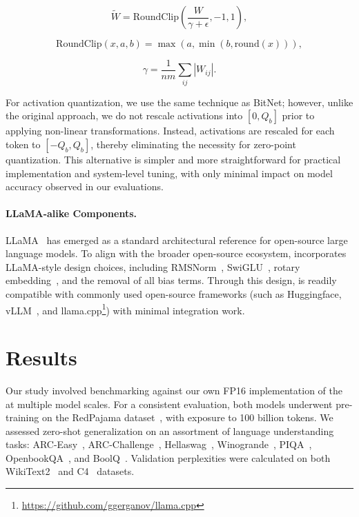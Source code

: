 \begin{equation}
    \widetilde{W} = \mathrm{RoundClip}(\frac{W}{\gamma + \epsilon}, -1, 1),
\end{equation}

\begin{equation}
    \mathrm{RoundClip}(x, a, b) = \max(a, \min(b, \mathrm{round}(x))),
\end{equation}

\begin{equation}
    \gamma = \frac{1}{nm}\sum_{ij} |W_{ij}|.
\end{equation}

For activation quantization, we use the same technique as BitNet; however, unlike the original approach, we do not rescale activations into $[0, Q_b]$ prior to applying non-linear transformations. Instead, activations are rescaled for each token to $[-Q_b, Q_b]$, thereby eliminating the necessity for zero-point quantization. This alternative is simpler and more straightforward for practical implementation and system-level tuning, with only minimal impact on model accuracy observed in our evaluations.

\paragraph{LLaMA-alike Components.}

LLaMA~\cite{llama, llama2} has emerged as a standard architectural reference for open-source large language models. To align with the broader open-source ecosystem,  incorporates LLaMA-style design choices, including RMSNorm~\cite{rmsnorm}, SwiGLU~\cite{swiglu}, rotary embedding~\cite{rope}, and the removal of all bias terms. Through this design,  is readily compatible with commonly used open-source frameworks (such as Huggingface, vLLM~\cite{vllm}, and llama.cpp\footnote{\url{https://github.com/ggerganov/llama.cpp}}) with minimal integration work.

\section{Results}

Our study involved benchmarking  against our own FP16 implementation of the  at multiple model scales. For a consistent evaluation, both models underwent pre-training on the RedPajama dataset~\cite{redpajama}, with exposure to 100 billion tokens. We assessed zero-shot generalization on an assortment of language understanding tasks: ARC-Easy~\cite{arc}, ARC-Challenge~\cite{arc}, Hellaswag~\cite{hellaswag}, Winogrande~\cite{winoGrande}, PIQA~\cite{piqa}, OpenbookQA~\cite{openbookqa}, and BoolQ~\cite{boolq}. Validation perplexities were calculated on both WikiText2~\cite{wikitext2} and C4~\cite{c4} datasets.

